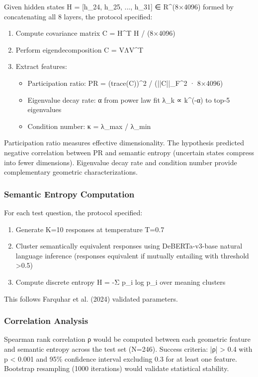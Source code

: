 Given hidden states H = [h_24, h_25, ..., h_31] ∈ R^(8×4096) formed by concatenating all 8 layers, the protocol specified:

\begin{enumerate}
\item Compute covariance matrix C = H^T H / (8×4096)
\item Perform eigendecomposition C = VΛV^T
\item Extract features:
\begin{itemize}
\item Participation ratio: PR = (trace(C))^2 / (||C||_F^2 · 8×4096)
\item Eigenvalue decay rate: α from power law fit λ_k ∝ k^(-α) to top-5 eigenvalues
\item Condition number: κ = λ_max / λ_min
\end{itemize}
\end{enumerate}

Participation ratio measures effective dimensionality. The hypothesis predicted negative correlation between PR and semantic entropy (uncertain states compress into fewer dimensions). Eigenvalue decay rate and condition number provide complementary geometric characterizations.

\subsubsection{Semantic Entropy Computation}

For each test question, the protocol specified:

\begin{enumerate}
\item Generate K=10 responses at temperature T=0.7
\item Cluster semantically equivalent responses using DeBERTa-v3-base natural language inference (responses equivalent if mutually entailing with threshold >0.5)
\item Compute discrete entropy H = -Σ p_i log p_i over meaning clusters
\end{enumerate}

This follows Farquhar et al. (2024) validated parameters.

\subsubsection{Correlation Analysis}

Spearman rank correlation ρ would be computed between each geometric feature and semantic entropy across the test set (N=246). Success criteria: |ρ| > 0.4 with p < 0.001 and 95\% confidence interval excluding 0.3 for at least one feature. Bootstrap resampling (1000 iterations) would validate statistical stability.

